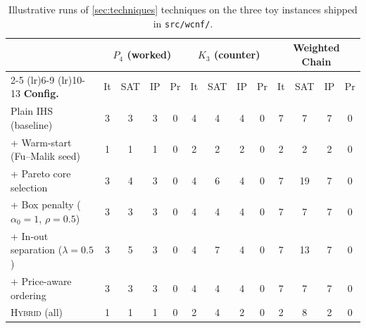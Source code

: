 \begin{table}[htbp]
\centering
\small
\caption{Illustrative runs of \cref{sec:techniques} techniques on the three
toy instances shipped in \texttt{src/wcnf/}.}
\label{tab:results}
\setlength{\tabcolsep}{4.5pt}
\renewcommand{\arraystretch}{1.15}
\begin{tabular}{l cccc cccc cccc}
\toprule
& \multicolumn{4}{c}{\textbf{$P_4$ (worked)}}
& \multicolumn{4}{c}{\textbf{$K_3$ (counter)}}
& \multicolumn{4}{c}{\textbf{Weighted Chain}} \\
\cmidrule(lr){2-5} \cmidrule(lr){6-9} \cmidrule(lr){10-13}
\textbf{Config.}
& It & SAT & IP & Pr
& It & SAT & IP & Pr
& It & SAT & IP & Pr \\
\midrule
Plain IHS (baseline)         & 3 & 3 & 3 & 0  & 4 & 4 & 4 & 0  & 7 & 7  & 7 & 0 \\
+ Warm-start (Fu--Malik seed)& 1 & 1 & 1 & 0  & 2 & 2 & 2 & 0  & 2 & 2  & 2 & 0 \\
+ Pareto core selection      & 3 & 4 & 3 & 0  & 4 & 6 & 4 & 0  & 7 & 19 & 7 & 0 \\
+ Box penalty ($\alpha_0{=}1$, $\rho{=}0.5$)
                              & 3 & 3 & 3 & 0  & 4 & 4 & 4 & 0  & 7 & 7  & 7 & 0 \\
+ In-out separation ($\lambda{=}0.5$)
                              & 3 & 5 & 3 & 0  & 4 & 7 & 4 & 0  & 7 & 13 & 7 & 0 \\
+ Price-aware ordering       & 3 & 3 & 3 & 0  & 4 & 4 & 4 & 0  & 7 & 7  & 7 & 0 \\
\textsc{Hybrid} (all)        & 1 & 1 & 1 & 0  & 2 & 4 & 2 & 0  & 2 & 8  & 2 & 0 \\
\bottomrule
\end{tabular}
\end{table}

